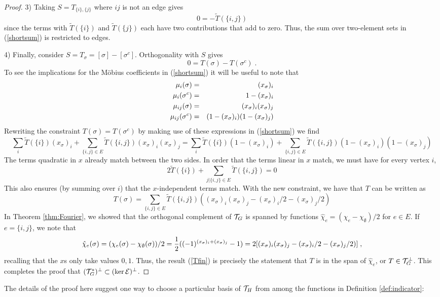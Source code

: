 \documentclass[12pt]{article}
\theoremstyle{definition}
\begin{document}
\begin{proof}
3) Taking $S = T_{\{i\},\{j\}}$ where $ij$ is not an edge gives 
\[
0 = -\tilde{T}(\{i,j\}) 
\]
since the terms with $\tilde{T}(\{i\})$ and $\tilde{T}(\{j\})$ each have two contributions that add to zero. Thus, the sum over two-element sets in (\ref{shortsum}) is restricted to edges.

4) Finally, consider $S = T_{\sigma} = [\sigma] - [\sigma^c]$. Orthogonality with $S$ gives
\[
0 = T(\sigma) - T(\sigma^c) \; .
\]
To see the implications for the Möbius coefficients in (\ref{shortsum}) it will be useful to note that
\begin{eqnarray*}
\mu_{i}(\sigma) &=& (x_\sigma)_i \cr
\mu_{i}(\sigma^c) &=&  1-(x_\sigma)_i \cr
\mu_{ij}(\sigma) &=&  (x_\sigma)_i(x_\sigma)_j \cr
\mu_{ij}(\sigma^c) &=&  (1-(x_\sigma)_i)(1-(x_\sigma)_j)
\end{eqnarray*}
Rewriting the constraint $T(\sigma) = T(\sigma^c)$ by making use of these expressions in (\ref{shortsum}) we find
\[
\sum_i \tilde{T}(\{i\}) (x_\sigma)_i +\sum_{\{i,j\} \in E} \tilde{T}(\{i,j\}) (x_\sigma)_i(x_\sigma)_j = \sum_i \tilde{T}(\{i\}) ( 1-(x_\sigma)_i ) +\sum_{\{i,j\} \in E} \tilde{T}(\{i,j\})  (1-(x_\sigma)_i)(1-(x_\sigma)_j)
\]
The terms quadratic in $x$ already match between the two sides. In order that the terms linear in $x$ match, we must have for every vertex $i$, 
\[
2\tilde{T}(\{i\}) + \sum_{j |\{i,j\} \in E} \tilde{T}(\{i,j\}) = 0
\]
This also ensures (by summing over $i$) that the $x$-independent terms match. With the new constraint, we have that $T$ can be written as
\begin{equation}
\label{Tfin}
T(\sigma) = \sum_{\{i,j\} \in E} \tilde{T}(\{i,j\}) ((x_\sigma)_i(x_\sigma)_j - (x_\sigma)_i/2 - (x_\sigma)_j/2)
\end{equation}
In Theorem \ref{thm:Fourier}, we showed that the orthogonal complement of ${\cal T}_G$ is spanned by functions $\hat{\chi}_e = (\chi_e - \chi_\emptyset)/2$ for $e \in E$. If $e = \{i,j\}$, we note that
\[
\hat{\chi}_e(\sigma) = (\chi_e(\sigma) - \chi_\emptyset(\sigma))/2 = {1\over 2} ((-1)^{(x_\sigma)_i + (x_\sigma)_j} - 1) = 2 [(x_\sigma)_i (x_\sigma)_j - (x_\sigma)_i/2 - (x_\sigma)_j/2)]  \; ,
\]
recalling that the $x$s only take values $0,1$. Thus, the result (\ref{Tfin}) is precisely the statement that $T$ is in the span of $\hat{\chi}_e$, or $T \in {\cal T}_G^\perp$. This completes the proof that $({\cal T}_G^*)^\perp \subset (\ker {\cal E})^\perp$.
\end{proof}
The details of the proof here suggest one way to choose a particular basis of ${\cal T}_H$ from among the functions in Definition \ref{def:indicator}:
\end{document}

